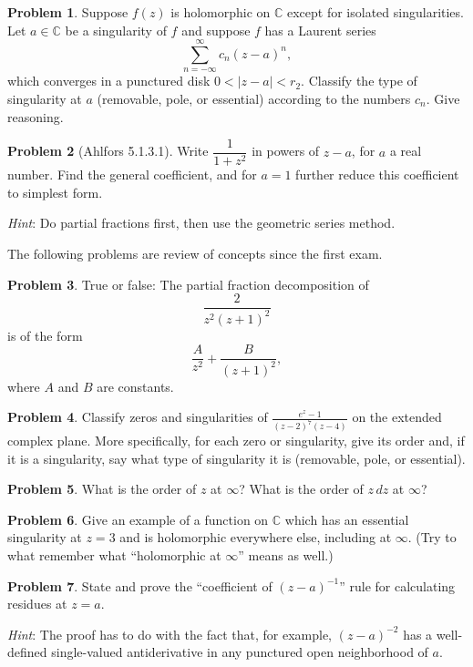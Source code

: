 \documentclass[11pt,oneside]{amsart}
\theoremstyle{definition}
\newtheorem{problem}{Problem}
\newcommand{\bC}{\mathbb{C}}
\begin{document}
\begin{problem}
  Suppose $f(z)$ is holomorphic on $\bC$ except for isolated singularities. Let $a\in\bC$ be a singularity of $f$ and suppose $f$ has a Laurent series
  \[\sum_{n=-\infty}^\infty c_n (z-a)^n,\]
  which converges in a punctured disk $0<|z-a|<r_2$. Classify the type of singularity at $a$ (removable, pole, or essential) according to the numbers $c_n$. Give reasoning.
\end{problem}

\begin{problem}[Ahlfors 5.1.3.1]
  Write $\dfrac 1{1+z^2}$ in powers of $z-a$, for $a$ a real number. Find the general coefficient, and for $a=1$ further reduce this coefficient to simplest form.

  \emph{Hint}: Do partial fractions first, then use the geometric series method.
\end{problem}
\newpage

The following problems are review of concepts since the first exam.

\begin{problem}
  True or false: The partial fraction decomposition of
  \[\frac 2{z^2(z+1)^2}\]
  is of the form
  \[\frac A{z^2}+\frac B{(z+1)^2},\]
  where $A$ and $B$ are constants.
\end{problem}

\begin{problem}
  Classify zeros and singularities of $\frac{e^z-1}{(z-2)^7(z-4)}$ on the extended complex plane. More specifically, for each zero or singularity, give its order and, if it is a singularity, say what type of singularity it is (removable, pole, or essential). 
\end{problem}

\begin{problem}
  What is the order of $z$ at $\infty$? What is the order of $z\,dz$ at $\infty$?
\end{problem}

\begin{problem}
  Give an example of a function on $\bC$ which has an essential singularity at $z=3$ and is holomorphic everywhere else, including at $\infty$. (Try to what remember what ``holomorphic at $\infty$'' means as well.)
\end{problem}

\begin{problem}
  State and prove the ``coefficient of $(z-a)^{-1}$'' rule for calculating residues at $z=a$.
  
  \emph{Hint}: The proof has to do with the fact that, for example, $(z-a)^{-2}$ has a well-defined single-valued antiderivative in any punctured open neighborhood of $a$.
\end{problem}
\end{document}
